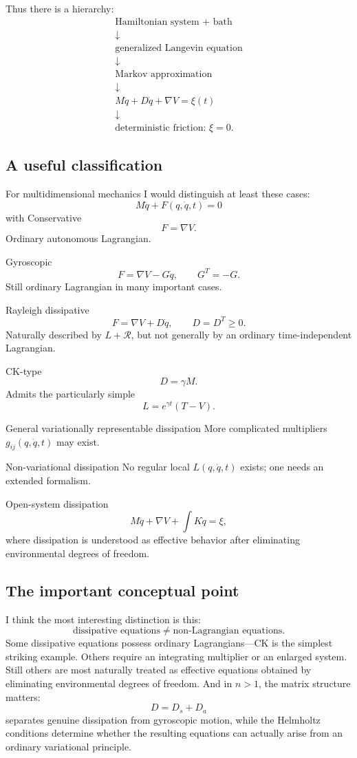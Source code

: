 Thus there is a hierarchy:
$$ \boxed{ 
\begin{array}{c} 
\text{Hamiltonian system + bath}\\
\downarrow\\ 
\text{generalized Langevin equation}\\
\downarrow\\
\text{Markov approximation}\\ 
\downarrow\\ 
M\ddot q+D\dot q+\nabla V=\xi(t)\\
\downarrow\\
\text{deterministic friction: }\xi=0. 
\end{array}} $$

\subsection{A useful classification}

For multidimensional mechanics I would distinguish at least these cases:
$$ \boxed{ M\ddot q+F(q,\dot q,t)=0 } $$
with Conservative $$ F=\nabla V. $$
Ordinary autonomous Lagrangian.

Gyroscopic $$ F=\nabla V-G\dot q, \qquad G^T=-G. $$
Still ordinary Lagrangian in many important cases.

Rayleigh dissipative
$$ F=\nabla V+D\dot q, \qquad D=D^T\geq0. $$
Naturally described by \(L+\mathcal R\), but not generally by an ordinary time-independent Lagrangian.

CK-type $$ D=\gamma M. $$
Admits the particularly simple
$$ L=e^{\gamma t}(T-V). $$

General variationally representable dissipation
More complicated multipliers \(g_{ij}(q,\dot q,t)\) may exist.

Non-variational dissipation
No regular local \(L(q,\dot q,t)\) exists; one needs an extended formalism.

Open-system dissipation
$$ M\ddot q+\nabla V+\int K\dot q=\xi, $$
where dissipation is understood as effective behavior after eliminating environmental degrees of freedom.

\subsection{The important conceptual point}

I think the most interesting distinction is this:
$$ \boxed{ \text{dissipative equations} \neq \text{non-Lagrangian equations}. } $$
Some dissipative equations possess ordinary Lagrangians—CK is the simplest striking example. Others require an integrating multiplier or an enlarged system. Still others are most naturally treated as effective equations obtained by eliminating environmental degrees of freedom.
And in \(n>1\), the matrix structure matters:
$$ \boxed{ D=D_s+D_a } $$
separates genuine dissipation from gyroscopic motion, while the Helmholtz conditions determine whether the resulting equations can actually arise from an ordinary variational principle.

